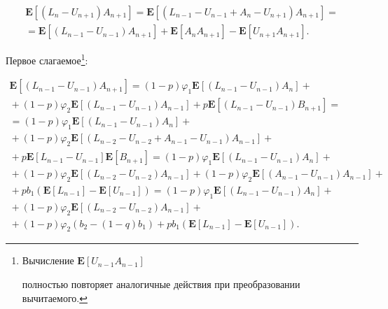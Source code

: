 \begin{multline}

\mathbf{E}\left[\left(L_n-U_{n+1}\right)A_{n+1}\right]=

\mathbf{E}\left[\left(L_{n-1}-U_{n-1}+A_n-U_{n+1}\right)A_{n+1}\right]={}\\

{}=\mathbf{E}\left[\left(L_{n-1}-U_{n-1}\right)A_{n+1}\right]+

\mathbf{E}\left[A_n A_{n+1}\right]-\mathbf{E}\left[U_{n+1} A_{n+1}\right].

\label{alpha}

\end{multline}

Первое слагаемое\footnote{Вычисление $\mathbf{E}[U_{n-1}A_{n-1}]$

полностью повторяет аналогичные действия при преобразовании вычитаемого.}:

\begin{multline*}

\mathbf{E}\left[\left(L_{n-1}-U_{n-1}\right)A_{n+1}\right]=

(1-p)\varphi_1\mathbf{E}\left[(L_{n-1}-U_{n-1})A_n\right]+{}\\[1.5pt]

{}+(1-p)\varphi_2\mathbf{E}\left[\left(L_{n-1}-U_{n-1}\right)A_{n-1}\right]+

p\mathbf{E}\left[\left(L_{n-1}-U_{n-1}\right)B_{n+1}\right]={}\\[1.5pt]

{}=(1-p)\varphi_1\mathbf{E}\left[\left(L_{n-1}-U_{n-1}\right)A_n\right]+{}\\[1.5pt]

{}+

(1-p)\varphi_2\mathbf{E}\left[\left(L_{n-2}-U_{n-2}+A_{n-1}-U_{n-1}\right)A_{n-1}\right]+{}\\[1.5pt]

{}+p\mathbf{E}\left[L_{n-1}-U_{n-1}\right]\mathbf{E}\left[B_{n+1}\right]=

(1-p)\varphi_1\mathbf{E}\left[\left(L_{n-1}-U_{n-1}\right)A_n\right]+{}\\[1.5pt]

{}+(1-p)\varphi_2\mathbf{E}\left[\left(L_{n-2}-U_{n-2}\right)A_{n-1}\right]+

(1-p)\varphi_2\mathbf{E}\left[\left(A_{n-1}-U_{n-1}\right)A_{n-1}\right]+{}\\[1.5pt]

{}+pb_1\left(\mathbf{E}\left[L_{n-1}\right]-\mathbf{E}\left[U_{n-1}\right]\right)=

(1-p)\varphi_1\mathbf{E}\left[\left(L_{n-1}-U_{n-1}\right)A_n\right]+{}\\[1.5pt]

{}+(1-p)\varphi_2\mathbf{E}\left[\left(L_{n-2}-U_{n-2}\right)A_{n-1}\right]+{}\\[1.5pt]

{}+

(1-p)\varphi_2\left(b_2-(1-q)b_1\right)+pb_1\left(\mathbf{E}\left[L_{n-1}\right]-

\mathbf{E}\left[U_{n-1}\right]\right).

\end{multline*}

